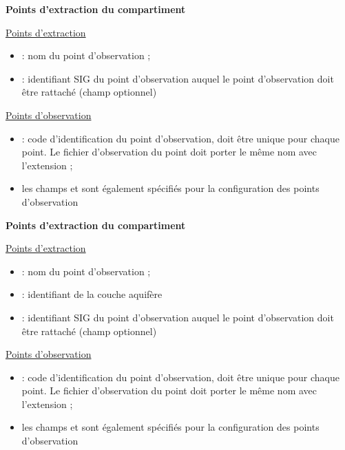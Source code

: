 \begin{minipage}[t]{0.45\textwidth}
    \textbf{Points d'extraction du compartiment }
    \vspace{4pt}

     \underline{Points d'extraction}

    \begin{itemize}
        \item {} : nom du point d'observation ;
        \item {} : identifiant SIG du point d'observation auquel le point d'observation doit être rattaché (champ optionnel)
    \end{itemize}

    \vspace{2pt}
    \underline{Points d'observation}
    \begin{itemize}
        \item {} : code d'identification du point d'observation, doit être unique pour chaque point. Le fichier d'observation du point doit porter le même nom avec l'extension  ;
        \item les champs  et  sont également spécifiés pour la configuration des points d'observation
    \end{itemize}
    \vspace{8pt}
    \textbf{Points d'extraction du compartiment }
    \vspace{4pt}

     \underline{Points d'extraction}

    \begin{itemize}
        \item {} : nom du point d'observation ;
        \item {} : identifiant de la couche aquifère
        \item {} : identifiant SIG du point d'observation auquel le point d'observation doit être rattaché (champ optionnel)
    \end{itemize}

    \vspace{2pt}
    \underline{Points d'observation}
    \begin{itemize}
        \item {} : code d'identification du point d'observation, doit être unique pour chaque point. Le fichier d'observation du point doit porter le même nom avec l'extension  ;
        \item les champs  et  sont également spécifiés pour la configuration des points d'observation
    \end{itemize}


\end{minipage}%
